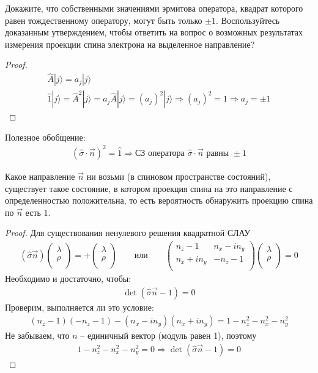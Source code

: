 \documentclass[__main__.tex]{subfiles}
\begin{document}
Докажите, что собственными значениями эрмитова оператора, квадрат которого равен тождественному оператору, могут быть только $\pm 1$. Воспользуйтесь доказанным утверждением, чтобы ответить на вопрос о возможных результатах измерения проекции спина электрона на выделенное направление?\\ 

\begin{proof}
\begin{gather*}
\hat{A}|j\rangle = a_j|j\rangle\\
\hat{1}|j\rangle =\hat{A}^2|j\rangle = a_j\hat{A}|j\rangle = (a_j)^2|j\rangle \Longrightarrow (a_j)^2=1 \Longrightarrow a_j=\pm 1
\end{gather*}
\end{proof}
Полезное обобщение:
\begin{gather*}
(\hat{\sigma}\cdot \vec{n})^2=\hat{1} \Longrightarrow \mbox {СЗ оператора } \hat{\sigma}\cdot \vec{n} \mbox{ равны } \pm 1
\end{gather*}

\begin{statement}
Какое направление $\vec{n}$ ни возьми (в спиновом пространстве состояний), существует такое состояние, в котором проекция спина на это направление с определенностью положительна, то есть вероятность обнаружить проекцию спина по $\vec{n}$ есть 1.
\end{statement}
\begin{proof}
Для существования ненулевого решения квадратной СЛАУ
\begin{gather*}
\left(\hat{\sigma}\vec{n}\right)\left(
\begin{matrix}
\lambda \\
\rho \\
\end{matrix}
\right) = +\left(
\begin{matrix}
\lambda \\
\rho \\
\end{matrix}
\right) \qquad \mbox{или} \qquad \left(
\begin{matrix}
n_z-1 & n_x-in_y \\
n_x+in_y & -n_z-1 \\
\end{matrix}
\right)\left(
\begin{matrix}
\lambda \\
\rho \\
\end{matrix}
\right) = 0
\end{gather*}
Необходимо и достаточно, чтобы:
\begin{gather*}
\det{(\hat{\sigma}\vec{n}-1)}=0
\end{gather*}
Проверим, выполняется ли это условие:
\begin{gather*}
(n_z-1)(-n_z-1)-(n_x-in_y)(n_x+in_y)=1-n_z^2-n_x^2-n_y^2
\end{gather*}
Не забываем, что $n$ -- единичный вектор (модуль равен 1), поэтому 
\begin{gather*}
1-n_z^2-n_x^2-n_y^2=0 \Longrightarrow \det{(\hat{\sigma}\vec{n}-1)}=0 
\end{gather*}
\end{proof}
\end{document}
